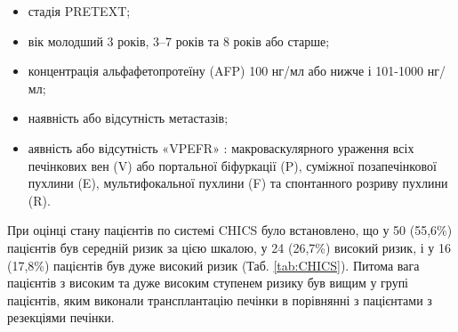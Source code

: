 \begin{itemize}
    \item стадія PRETEXT; 
    \item вік молодший 3 років, 3–7 років та 8 років або старше;
    \item концентрація альфафетопротеїну (AFP) 100 нг/мл або нижче і 101-1000 нг/мл;
    \item наявність або відсутність метастазів;
    \item аявність або відсутність «VPEFR» : макроваскулярного ураження всіх печінкових вен (V) або портальної біфуркації (P), суміжної позапечінкової пухлини (E), мультифокальної пухлини (F) та спонтанного розриву пухлини (R).
\end{itemize}

При оцінці стану пацієнтів по системі CHICS було встановлено, що у 50 (55,6\%) пацієнтів був середній ризик за цією шкалою, у 24 (26,7\%) високий ризик, і у 16 (17,8\%) пацієнтів був дуже високий ризик  (Таб. \ref{tab:CHICS}). Питома вага пацієнтів з високим та дуже високим ступенем ризику був вищим у групі пацієнтів, яким виконали трансплантацію печінки в порівнянні з пацієнтами з резекціями печінки.





